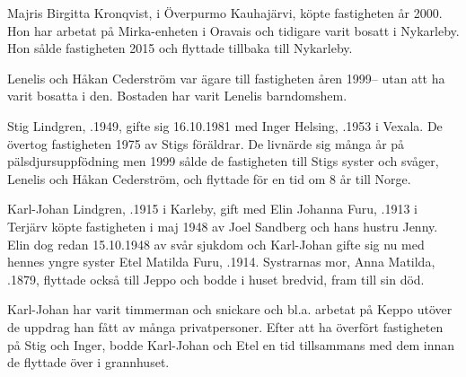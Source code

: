 Majris Birgitta Kronqvist,  i Överpurmo Kauhajärvi, köpte fastigheten år 2000. Hon har arbetat på Mirka-enheten i Oravais och tidigare varit bosatt i Nykarleby. Hon sålde fastigheten 2015 och flyttade tillbaka till Nykarleby.\jhvspace{}


Lenelis och Håkan Cederström var ägare till fastigheten åren 1999-- utan att ha varit bosatta i den. Bostaden har varit Lenelis barndomshem.\jhvspace{}


Stig Lindgren, .1949, gifte sig 16.10.1981 med Inger Helsing, .1953 i Vexala. De övertog fastigheten 1975 av Stigs föräldrar. De livnärde sig många år på pälsdjursuppfödning men 1999 sålde de fastigheten  till Stigs syster och svåger, Lenelis och Håkan Cederström, och flyttade för en tid om 8 år till Norge.


Karl-Johan Lindgren, .1915 i Karleby,  gift med Elin Johanna Furu, .1913 i Terjärv köpte fastigheten i maj 1948 av Joel Sandberg och hans hustru Jenny. Elin dog redan 15.10.1948 av svår sjukdom och Karl-Johan gifte sig nu med hennes yngre syster Etel Matilda Furu, .1914. Systrarnas mor, Anna Matilda, .1879, flyttade också till Jeppo och bodde i huset bredvid, fram till sin död.

Karl-Johan har varit timmerman och snickare och bl.a. arbetat på Keppo utöver de uppdrag han fått av många privatpersoner. Efter att ha överfört fastigheten på Stig och Inger, bodde Karl-Johan och Etel en tid tillsammans med dem innan de flyttade över i grannhuset.
\begin{jhchildren}
  \item {}
  \item {}
  \item {}
  \item {}
  \item {}
\end{jhchildren}

